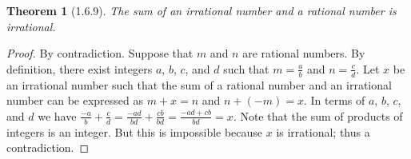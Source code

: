 \documentclass[a4paper, 12pt]{article}
\theoremstyle{plain}
\newtheorem*{theorem*}{Theorem}
\begin{document}
	
	\begin{theorem*}[1.6.9]
		The sum of an irrational number and a rational number is irrational.
	\end{theorem*}
	
	\begin{proof}
		By contradiction. Suppose that $m$ and $n$ are rational numbers. By definition, there exist integers
		$a$, $b$, $c$, and $d$ such that $m = \frac{a}{b}$ and $n = \frac{c}{d}$. Let $x$ be an irrational 
		number such that the sum of a rational number and an irrational number can be expressed as 
		$m + x = n$ and $n + (-m) = x$. In terms of $a$, $b$, $c$, and $d$ we have 
		$\frac{-a}{b} + \frac{c}{d} = \frac{-ad}{bd} + \frac{cb}{bd} = \frac{-ad + cb}{bd} = x$. Note that 
		the sum of products of integers is an integer. But this is impossible because $x$ is irrational; 
		thus a contradiction.
	\end{proof}
\end{document}
